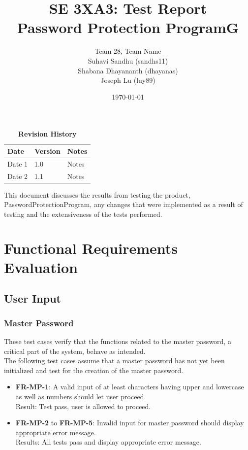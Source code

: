 \documentclass[12pt, titlepage]{article}
\title{SE 3XA3: Test Report\\Password Protection ProgramG}
\author{Team 28, Team Name
		\\ Suhavi Sandhu (sandhs11)
		\\ Shabana Dhayananth (dhayanas)
		\\ Joseph Lu (luy89)
}
\date{\today}
\begin{document}
\maketitle

\tableofcontents
\listoftables
\listoffigures

\begin{table}[bp]
\caption{\bf Revision History}
\begin{tabularx}{\textwidth}{p{3cm}p{2cm}X}
\toprule {\bf Date} & {\bf Version} & {\bf Notes}\\
\midrule
Date 1 & 1.0 & Notes\\
Date 2 & 1.1 & Notes\\
\bottomrule
\end{tabularx}
\end{table}

\newpage


This document discusses the results from testing the product, PasswordProtectionProgram, any changes that were implemented as a result of testing and the extensiveness of the tests performed.

\section{Functional Requirements Evaluation}

	\subsection{User Input}
	
		\subsubsection{Master Password}
			These test cases verify that the functions related to the master password, a critical part of the system, behave as intended.\\
			
			The following test cases assume that a master password has not yet been initialized and test for the creation of the master password.
			
			\begin{itemize}
			
				\item \textbf{FR-MP-1}: A valid input of at least characters having upper and lowercase as well as numbers should let user proceed.\\
				 Result: Test pass, user is allowed to proceed.
				 
				\item \textbf{FR-MP-2} to \textbf{FR-MP-5}: Invalid input for master password should display appropriate error message.\\
				 Results: All tests pass and display appropriate error message.
			
			\end{itemize}
			 
\end{document}
